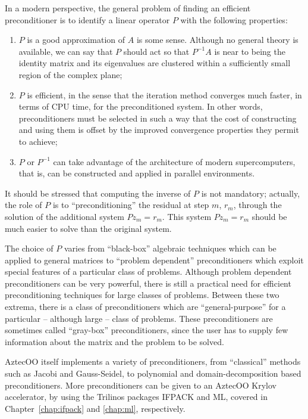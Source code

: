 In a modern perspective, the general problem of finding an efficient
preconditioner is to identify a linear operator $P$ with the following
properties:
\begin{enumerate}
\item $P$ is a good approximation of $A$ is some sense. Although no
  general theory is available, we can say that $P$ should act so that
  $P^{-1} A$ is near to being the identity matrix and its eigenvalues
  are clustered within a sufficiently small region of the complex plane;
\item $P$ is efficient, in the sense that the iteration method converges
  much faster, in terms of CPU time, for the preconditioned system.  In
  other words, preconditioners must be selected in such a way that the
  cost of constructing and using them is offset by the improved
  convergence properties they permit to achieve;
\item $P$ or $P^{-1}$ can take advantage of the architecture of modern
  supercomputers, that is, can be constructed and applied in parallel
  environments.
\end{enumerate}

It should be stressed that computing the inverse of $P$ is not
mandatory; actually, the role of $P$ is to ``preconditioning'' the
residual at step $m$, $r_m$, through the solution of the additional
system $P z_m = r_m$. This system $P z_m = {r}_m$ should be much easier
to solve than the original system.

\smallskip

The choice of $P$ varies from ``black-box'' algebraic techniques which
can be applied to general matrices to ``problem dependent''
preconditioners which exploit special features of a particular class
of problems. Although problem dependent preconditioners can be very
powerful, there is still a practical need for efficient
preconditioning techniques for large classes of problems. Between
these two extrema, there is a class of preconditioners which are
``general-purpose'' for a particular -- although large -- class of
problems.  These preconditioners are sometimes called ``gray-box''
preconditioners, since the user has to supply few information about
the matrix and the problem to be solved.

AztecOO itself implements a variety of preconditioners, from
``classical'' methods such as Jacobi and Gauss-Seidel, to polynomial and
domain-decomposition based preconditioners. More preconditioners can be
given to an AztecOO Krylov accelerator, by using the Trilinos packages
IFPACK and ML, covered in Chapter~\ref{chap:ifpack} and \ref{chap:ml},
respectively.

